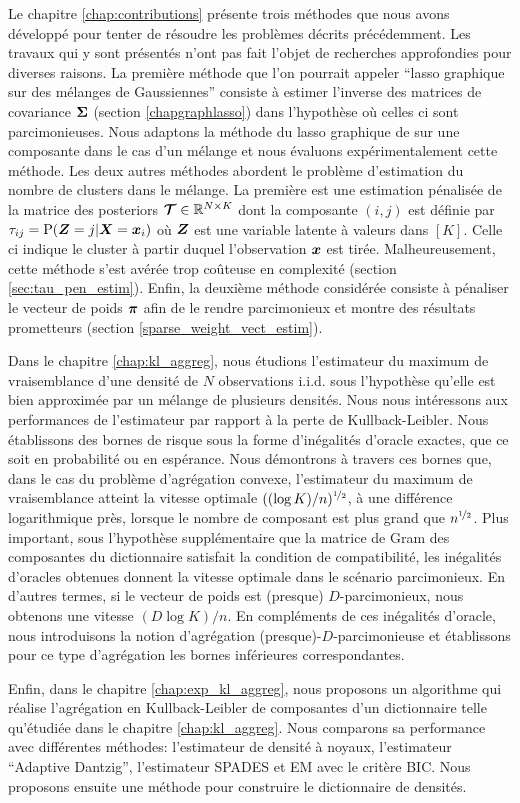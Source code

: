 Le chapitre \ref{chap:contributions} présente trois méthodes que nous avons développé pour tenter de résoudre les problèmes décrits précédemment. Les travaux qui y sont présentés n'ont pas fait l'objet de recherches approfondies pour diverses raisons. La première méthode que l'on pourrait appeler ``lasso graphique sur des mélanges de Gaussiennes'' consiste à estimer l'inverse des matrices de covariance $\boldsymbol\Sigma$ (section \ref{chapgraphlasso}) dans l'hypothèse où celles ci sont parcimonieuses. Nous adaptons la méthode du lasso graphique de \citep{glasso07} sur une composante dans le cas d'un mélange et nous évaluons expérimentalement cette méthode. Les deux autres méthodes abordent le problème d'estimation du nombre de clusters dans le mélange. La première est une estimation pénalisée de la matrice des posteriors $\boldsymbol{\mathcal T}\in{\mathbb R}^{N\times K}$ dont la composante $(i,j)$ est définie par $\tau_{ij}=\textnormal{P}(\boldsymbol Z=j|\boldsymbol X=\boldsymbol x_i)$ où $\boldsymbol Z$ est une variable latente à valeurs dans $[K]$. Celle ci indique le cluster à partir duquel l'observation $\boldsymbol x$ est tirée. Malheureusement, cette méthode s'est avérée trop coûteuse en complexité (section \ref{sec:tau_pen_estim}). Enfin, la deuxième méthode considérée consiste à pénaliser le vecteur de poids $\boldsymbol \pi$ afin de le rendre parcimonieux et montre des résultats prometteurs (section \ref{sparse_weight_vect_estim}).

Dans le chapitre \ref{chap:kl_aggreg}, nous étudions l'estimateur du maximum de vraisemblance d'une densité de $N$ observations i.i.d. sous l’hypothèse qu'elle est bien approximée par un mélange de plusieurs densités. Nous nous intéressons aux performances de l'estimateur par rapport à la perte de Kullback-Leibler. Nous établissons des bornes de risque sous la forme d'inégalités d'oracle exactes, que ce soit en probabilité ou en espérance. Nous démontrons à travers ces bornes que, dans le cas du problème d’agrégation convexe, l'estimateur du maximum de vraisemblance atteint la vitesse optimale $((\log K)/n)^{\nicefrac12}$, à une différence logarithmique près, lorsque le nombre de composant est plus grand que $n^{\nicefrac12}$. Plus important, sous l’hypothèse supplémentaire que la matrice de Gram des composantes du dictionnaire satisfait la condition de compatibilité, les inégalités d'oracles obtenues donnent la vitesse optimale dans le scénario parcimonieux. En d'autres termes, si le vecteur de poids est (presque) $D$-parcimonieux, nous obtenons une vitesse $(D\log K)/n$. En compléments de ces inégalités d'oracle, nous introduisons la notion d’agrégation (presque)-$D$-parcimonieuse et établissons pour ce type d’agrégation les bornes inférieures correspondantes.

Enfin, dans le chapitre \ref{chap:exp_kl_aggreg}, nous proposons un algorithme qui réalise l'agrégation en Kullback-Leibler de composantes d'un dictionnaire telle qu'étudiée dans le chapitre \ref{chap:kl_aggreg}. Nous comparons sa performance avec différentes méthodes: l'estimateur de densité à noyaux, l'estimateur ``Adaptive Dantzig'', l'estimateur SPADES et EM avec le critère BIC. Nous proposons ensuite une méthode pour construire le dictionnaire de densités.
